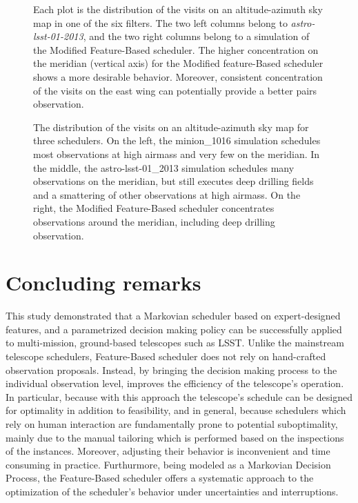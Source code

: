 \documentclass[12pt]{aastex62}
\theoremstyle{definition}
\begin{document}
\begin{figure}[h!]
\caption{Each plot is the distribution of the visits on an altitude-azimuth sky map in one of the six filters. The two left columns belong to \textit{astro-lsst-01-2013}, and the two right columns belong to a simulation of the Modified Feature-Based scheduler. The higher concentration on the meridian (vertical axis) for the Modified feature-Based scheduler shows a more desirable behavior. Moreover, consistent concentration of the visits on the east wing can potentially provide a better pairs observation.}
\label{fig_10yrs_AltAz}
\end{figure}


\begin{figure}
\caption{The distribution of the visits on an altitude-azimuth sky map for three schedulers. On the left, the minion\_1016 simulation schedules most observations at high airmass and very few on the meridian. In the middle, the astro-lsst-01\_2013 simulation schedules many observations on the meridian, but still executes deep drilling fields and a smattering of other observations at high airmass. On the right, the Modified Feature-Based scheduler concentrates observations around the meridian, including deep drilling observation. }\label{fig_all_alt_az}
\end{figure}

\section{Concluding remarks}\label{sec_conclusion}

This study demonstrated that a Markovian scheduler based on expert-designed features, and a parametrized decision making policy can be successfully applied to multi-mission, ground-based telescopes such as LSST. Unlike the mainstream telescope schedulers, Feature-Based scheduler does not rely on hand-crafted observation proposals. Instead, by bringing the decision making process to the individual observation level, improves the efficiency of the telescope's operation. In particular, because with this approach the telescope's schedule can be designed for optimality in addition to feasibility, and in general, because schedulers which rely on human interaction are fundamentally prone to potential suboptimality, mainly due to the manual tailoring which is performed based on the inspections of the instances. Moreover, adjusting their behavior is inconvenient and time consuming in practice. Furthurmore, being modeled as a Markovian Decision Process, the Feature-Based scheduler offers a systematic approach to the optimization of the scheduler's behavior under uncertainties and interruptions.
\end{document}
